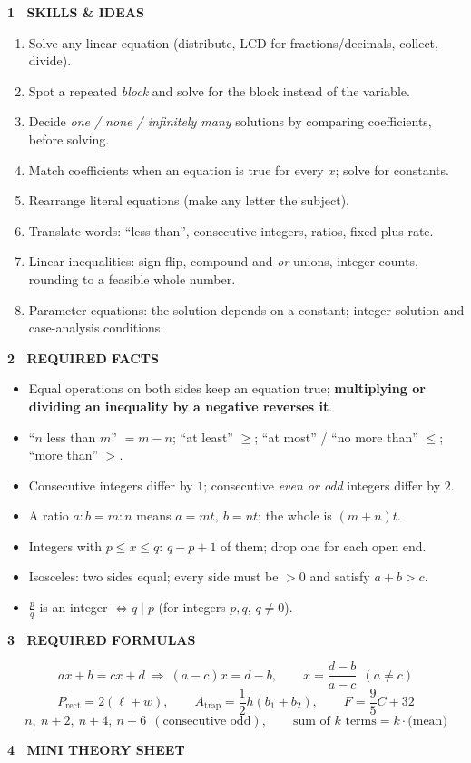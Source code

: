 \documentclass[10pt]{article}
\newcommand{\banner}[1]{\vspace{6pt}\par\noindent\begin{tcolorbox}[enhanced,colback=NAVY,colframe=NAVY,boxrule=0pt,arc=2pt,left=6pt,top=1pt,bottom=1pt,nobeforeafter]\color{white}\bfseries\small\MakeUppercase{#1}\end{tcolorbox}\par\nopagebreak\vspace{2pt}}
\begin{document}
\banner{1 \textperiodcentered\ Skills \& Ideas}
\begin{enumerate}[leftmargin=1.6em,itemsep=0pt,label=\textbf{S\arabic*.}]
\item Solve any linear equation (distribute, LCD for fractions/decimals, collect, divide).
\item Spot a repeated \emph{block} and solve for the block instead of the variable.
\item Decide \emph{one / none / infinitely many} solutions by comparing coefficients, before solving.
\item Match coefficients when an equation is true for every $x$; solve for constants.
\item Rearrange literal equations (make any letter the subject).
\item Translate words: ``less than'', consecutive integers, ratios, fixed-plus-rate.
\item Linear inequalities: sign flip, compound and \emph{or}-unions, integer counts, rounding to a feasible whole number.
\item Parameter equations: the solution depends on a constant; integer-solution and case-analysis conditions.
\end{enumerate}
\banner{2 \textperiodcentered\ Required Facts}
\begin{itemize}[leftmargin=1.4em,itemsep=0pt]
\item Equal operations on both sides keep an equation true; \textbf{multiplying or dividing an inequality by a negative reverses it}.
\item ``$n$ less than $m$'' $=m-n$; ``at least'' $\ge$; ``at most'' / ``no more than'' $\le$; ``more than'' $>$.
\item Consecutive integers differ by $1$; consecutive \emph{even or odd} integers differ by $2$.
\item A ratio $a:b=m:n$ means $a=mt,\ b=nt$; the whole is $(m+n)t$.
\item Integers with $p\le x\le q$: $q-p+1$ of them; drop one for each open end.
\item Isosceles: two sides equal; every side must be $>0$ and satisfy $a+b>c$.
\item $\frac{p}{q}$ is an integer $\iff q\mid p$ (for integers $p,q$, $q\neq0$).
\end{itemize}
\banner{3 \textperiodcentered\ Required Formulas}
\vspace{-4pt}\[
ax+b=cx+d\ \Longrightarrow\ (a-c)x=d-b,\qquad x=\dfrac{d-b}{a-c}\ \ (a\neq c)
\]
\vspace{-8pt}\[
P_{\text{rect}}=2(\ell+w),\qquad A_{\text{trap}}=\dfrac12h(b_1+b_2),\qquad F=\dfrac95C+32
\]
\vspace{-8pt}\[
n,\ n+2,\ n+4,\ n+6\ \ (\text{consecutive odd}),\qquad \text{sum of }k\text{ terms}=k\cdot\text{(mean)}
\]
\banner{4 \textperiodcentered\ Mini Theory Sheet}
\end{document}
